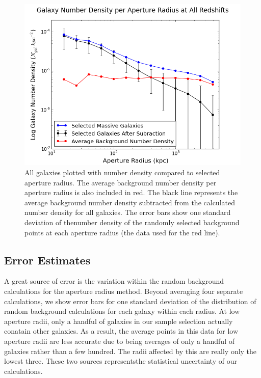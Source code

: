 \documentclass[apj]{emulateapj}
\begin{document}
\begin{figure}
\centering
\graphicspath{{C:/3d_hst/2015_finals/aperture_distance/}}
\includegraphics[width=\linewidth]{temp_compare}
\caption{\footnotesize All galaxies plotted with number density compared to selected aperture radius. The average background number density per aperture radius is also included in red. The black line represents the average background number density subtracted from the calculated number density for all galaxies. The error bars show one standard deviation of thenumber density of the randomly selected background points at each aperture radius (the data used for the red line).}
\label{fig:compare}
\end{figure}

\subsection{Error Estimates}

A great source of error is the variation within the random background calculations for the aperture radius method. Beyond averaging four separate calculations, we show error bars for one standard deviation of the distribution of random background calculations for each galaxy within each radius. At low aperture radii, only a handful of galaxies in our sample selection actually conatain other galaxies. As a result, the average points in this data for low aperture radii are less accurate due to being averages of only a handful of galaxies rather than a few hundred. The radii affected by this are really only the lowest three. These two sources representsthe statistical uncertainty of our calculations.
\end{document}
